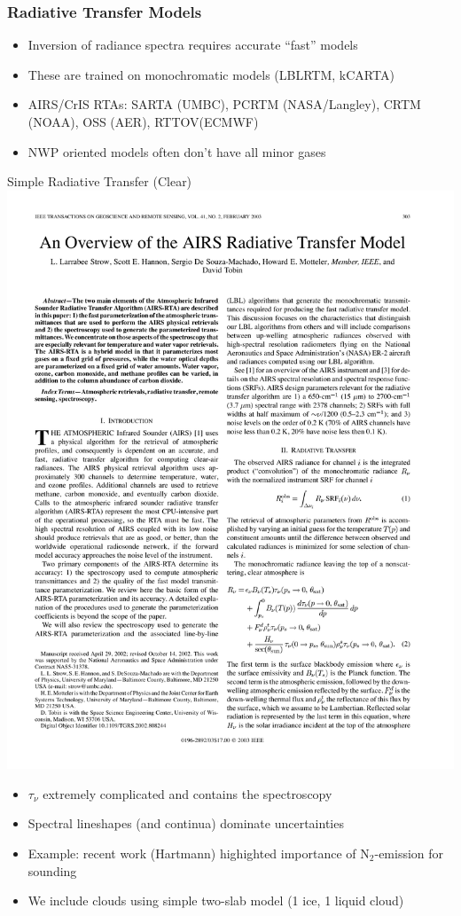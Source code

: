 \documentclass[10pt,t]{beamer}
\begin{document}
\begin{frame}
  \frametitle{Radiative Transfer Models}
  \begin{itemize}
  \item Inversion of radiance spectra requires accurate ``fast'' models
  \item These are trained on monochromatic models (LBLRTM, kCARTA)
  \item AIRS/CrIS RTAs:  SARTA (UMBC), PCRTM (NASA/Langley), CRTM (NOAA), OSS (AER), RTTOV(ECMWF)
  \item NWP oriented models often don't have all minor gases
  \end{itemize}
  \begin{block}{Simple Radiative Transfer (Clear)}
    \centering \includegraphics[width=0.55\linewidth]{Figslls/simple_rta.pdf}
   \begin{small}
    \begin{itemize}
    \item $\tau_{\nu}$ extremely complicated and contains the spectroscopy
    \item Spectral lineshapes (and continua) dominate uncertainties
    \item Example: recent work (Hartmann) highighted importance of N$_2$-\water emission for
      sounding
    \item We include clouds using simple two-slab model (1 ice, 1 liquid cloud)      
    \end{itemize}
 \end{small}
  \end{block}
\end{frame}
\end{document}

